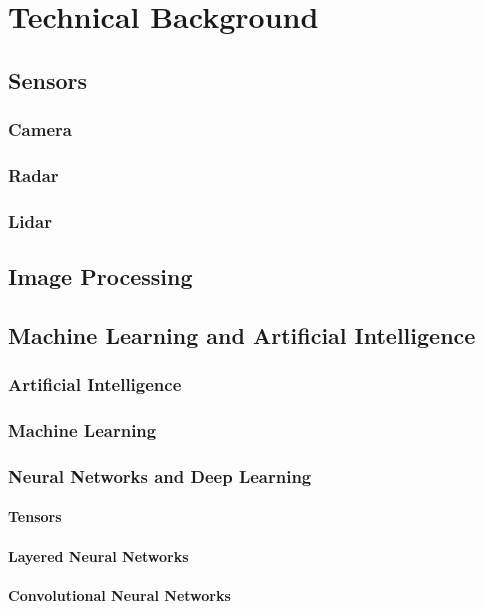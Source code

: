 \chapter{Technical Background}
\label{capitulo3}

\section{Sensors}
\subsection{Camera}
\subsection{Radar}
\subsection{Lidar}


\section{Image Processing}


\section{Machine Learning and Artificial Intelligence }
\subsection{Artificial Intelligence}
\subsection{Machine Learning}
\subsection{Neural Networks and Deep Learning}
\subsubsection{Tensors}
\subsubsection{Layered Neural Networks}
\subsubsection{Convolutional Neural Networks}
